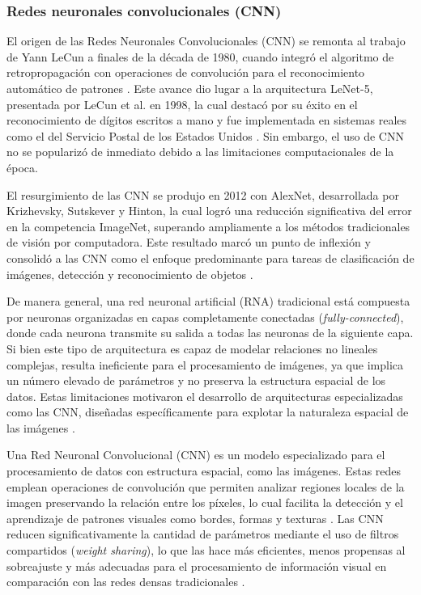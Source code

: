 	
	\subsubsection{Redes neuronales convolucionales (CNN)}
	
	El origen de las Redes Neuronales Convolucionales (CNN) se remonta al trabajo de Yann LeCun a finales de la década de 1980, cuando integró el algoritmo de retropropagación con operaciones de convolución para el reconocimiento automático de patrones \cite{lecun1989}. Este avance dio lugar a la arquitectura LeNet-5, presentada por LeCun et al. en 1998, la cual destacó por su éxito en el reconocimiento de dígitos escritos a mano y fue implementada en sistemas reales como el del Servicio Postal de los Estados Unidos \cite{lecun1998}. Sin embargo, el uso de CNN no se popularizó de inmediato debido a las limitaciones computacionales de la época.
	
	El resurgimiento de las CNN se produjo en 2012 con AlexNet, desarrollada por Krizhevsky, Sutskever y Hinton, la cual logró una reducción significativa del error en la competencia ImageNet, superando ampliamente a los métodos tradicionales de visión por computadora. Este resultado marcó un punto de inflexión y consolidó a las CNN como el enfoque predominante para tareas de clasificación de imágenes, detección y reconocimiento de objetos \cite{krizhevsky2012alexnet}.
	
	De manera general, una red neuronal artificial (RNA) tradicional está compuesta por neuronas organizadas en capas completamente conectadas (\textit{fully-connected}), donde cada neurona transmite su salida a todas las neuronas de la siguiente capa. Si bien este tipo de arquitectura es capaz de modelar relaciones no lineales complejas, resulta ineficiente para el procesamiento de imágenes, ya que implica un número elevado de parámetros y no preserva la estructura espacial de los datos. Estas limitaciones motivaron el desarrollo de arquitecturas especializadas como las CNN, diseñadas específicamente para explotar la naturaleza espacial de las imágenes \cite{haykin1999}.
	
	Una Red Neuronal Convolucional (CNN) es un modelo especializado para el procesamiento de datos con estructura espacial, como las imágenes. Estas redes emplean operaciones de convolución que permiten analizar regiones locales de la imagen preservando la relación entre los píxeles, lo cual facilita la detección y el aprendizaje de patrones visuales como bordes, formas y texturas \cite{oshea2015}. Las CNN reducen significativamente la cantidad de parámetros mediante el uso de filtros compartidos (\textit{weight sharing}), lo que las hace más eficientes, menos propensas al sobreajuste y más adecuadas para el procesamiento de información visual en comparación con las redes densas tradicionales \cite{oshea2015}.
	
